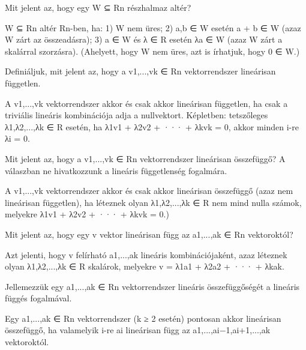 \begin{frame}
  \begin{tcolorbox}[title={1}]
      Mit jelent az, hogy egy W ⊆ Rn részhalmaz altér?

  \tcblower
W ⊆ Rn altér Rn-ben, ha: 1) W nem üres; 2) a,b ∈ W esetén a + b ∈ W (azaz W zárt az összeadásra); 3) a ∈ W és λ ∈ R esetén λa ∈ W (azaz W zárt a skalárral szorzásra). (Ahelyett, hogy W nem üres, azt is írhatjuk, hogy 0 ∈ W.)
  \end{tcolorbox}
\end{frame}


\begin{frame}
  \begin{tcolorbox}[title={2}]
      Deﬁniáljuk, mit jelent az, hogy a v1,...,vk ∈ Rn vektorrendszer lineárisan független.

  \tcblower
A v1,...,vk vektorrendszer akkor és csak akkor lineárisan független, ha csak a triviális lineáris kombinációja adja a nullvektort. Képletben: tetszőleges λ1,λ2,...,λk ∈ R esetén, ha λ1v1 + λ2v2 + ··· + λkvk = 0, akkor minden i-re λi = 0.
  \end{tcolorbox}
\end{frame}


\begin{frame}
  \begin{tcolorbox}[title={3}]
      Mit jelent az, hogy a v1,...,vk ∈ Rn vektorrendszer lineárisan összefüggő? A válaszban ne hivatkozzunk a lineáris függetlenség fogalmára.


  \tcblower
A v1,...,vk vektorrendszer akkor és csak akkor lineárisan összefüggő (azaz nem lineárisan független), ha léteznek olyan λ1,λ2,...,λk ∈ R nem mind nulla számok, melyekre λ1v1 + λ2v2 + ··· + λkvk = 0.)

  \end{tcolorbox}
\end{frame}

\begin{frame}
  \begin{tcolorbox}[title={4}]
     Mit jelent az, hogy egy v vektor lineárisan függ az a1,...,ak ∈ Rn vektoroktól?

  \tcblower
Azt jelenti, hogy v felírható a1,...,ak lineáris kombinációjaként, azaz léteznek olyan λ1,λ2,...,λk ∈ R skalárok, melyekre v = λ1a1 + λ2a2 + ··· + λkak.
  \end{tcolorbox}
\end{frame}


\begin{frame}
  \begin{tcolorbox}[title={5}]
    Jellemezzük egy a1,...,ak ∈ Rn vektorrendszer lineáris összefüggőségét a lineáris függés fogalmával.


  \tcblower
Egy a1,...,ak ∈ Rn vektorrendszer (k ≥ 2 esetén) pontosan akkor lineárisan összefüggő, ha valamelyik i-re ai lineárisan függ az a1,...,ai−1,ai+1,...,ak vektoroktól.
  \end{tcolorbox}
\end{frame}



